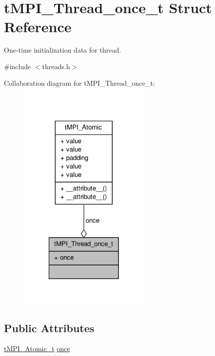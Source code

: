 \hypertarget{structtMPI__Thread__once__t}{\section{t\-M\-P\-I\-\_\-\-Thread\-\_\-once\-\_\-t \-Struct \-Reference}
\label{structtMPI__Thread__once__t}
}


\-One-\/time initialization data for thread.  




{\ttfamily \#include $<$threads.\-h$>$}



\-Collaboration diagram for t\-M\-P\-I\-\_\-\-Thread\-\_\-once\-\_\-t\-:
\nopagebreak
\begin{figure}[H]
\begin{center}
\leavevmode
\includegraphics[width=186pt]{structtMPI__Thread__once__t__coll__graph}
\end{center}
\end{figure}
\subsection*{\-Public \-Attributes}
\begin{DoxyCompactItemize}
\item 
\hyperlink{include_2thread__mpi_2atomic_2gcc_8h_a2c33794dc540e3b07cffc1f81a3fe4b4}{t\-M\-P\-I\-\_\-\-Atomic\-\_\-t} \hyperlink{structtMPI__Thread__once__t_a8c9cbb7ead68bb5ed0212941ad975f0b}{once}
\end{DoxyCompactItemize}



